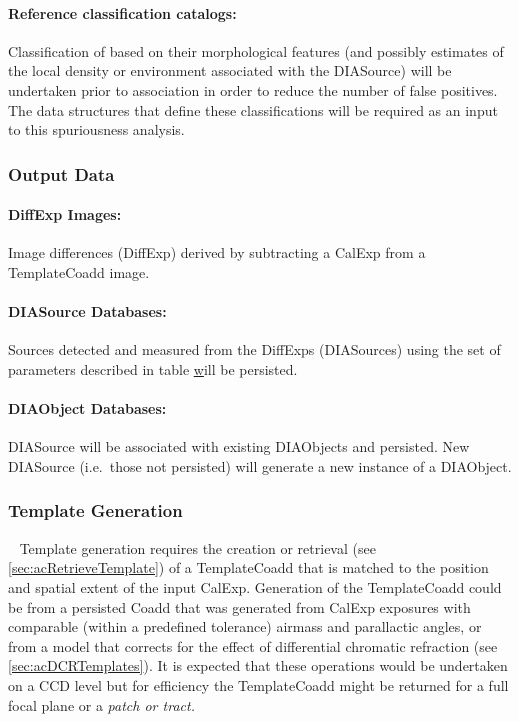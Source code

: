 \paragraph*{Reference classification catalogs:} Classification of \DIASources based on their morphological features (and possibly estimates of the local density or  environment associated with the DIASource) will be undertaken prior to association in order to reduce the number of false positives. The data structures that define these classifications will be required as an input to this spuriousness analysis. 



\subsubsection{Output Data}
\label{sec:apADOutput}

\paragraph*{DiffExp Images:} Image differences (DiffExp) derived by subtracting a CalExp from a TemplateCoadd image.

\paragraph*{DIASource Databases:} Sources detected and measured from the DiffExps (DIASources) using the set of parameters described in table \hyperref[table:ap_features] will be persisted.


\paragraph*{DIAObject Databases:} DIASource will be associated with existing DIAObjects and persisted. New DIASource (i.e.\ those not persisted) will generate a new instance of a DIAObject.


\subsubsection{Template Generation}~
\label{sec:apCRTemplates}
Template generation requires the creation or retrieval (see \ref{sec:acRetrieveTemplate}) of a TemplateCoadd that is matched to the position and spatial extent of the input CalExp. Generation of the TemplateCoadd could be from a persisted Coadd that was generated from CalExp exposures with comparable (within a predefined tolerance) airmass and parallactic angles, or from a model that corrects for the effect of  differential chromatic refraction (see \ref{sec:acDCRTemplates}). It is expected that these operations would be undertaken on a CCD level but for efficiency the TemplateCoadd might be returned for a full focal plane or a \it{patch} or \it{tract}. 


